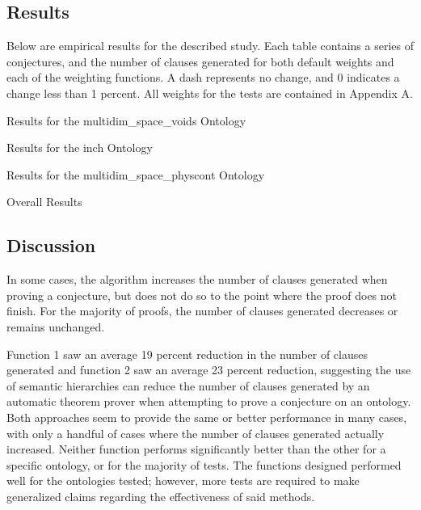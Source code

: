 \documentclass{article}
\begin{document}
\subsection{Results}
Below are empirical results for the described study. Each table contains a series of conjectures, and the number of clauses generated for both default weights and each of the weighting functions. A dash represents no change, and 0 indicates a change less than 1 percent.  All weights for the tests are contained in Appendix A. 
\vspace{1cm}
\begin{table}[h]
\centering
{}
\caption{Results for the multidim\_space\_voids Ontology}
\end{table}

\begin{table}[h]
\centering
{}
\caption{Results for the inch Ontology}
\end{table}

\begin{table}[h]
\centering
{}
\caption{Results for the multidim\_space\_physcont Ontology}
\end{table}

\begin{table}[h]
\centering
{}
\caption{Overall Results}
\end{table}

\newpage
\subsection{Discussion}
In some cases, the algorithm increases the number of clauses generated when proving a conjecture, but does not do so to the point where the proof does not finish. For the majority of proofs, the number of clauses generated decreases or remains unchanged.

Function 1 saw an average 19 percent reduction in the number of clauses generated and function 2 saw an average 23 percent reduction, suggesting the use of semantic hierarchies can reduce the number of clauses generated by an automatic theorem prover when attempting to prove a conjecture on an ontology. Both approaches seem to provide the same or better performance in many cases, with only a handful of cases where the number of clauses generated actually increased. Neither function performs significantly better than the other for a specific ontology, or for the majority of tests. The functions designed performed well for the ontologies tested; however, more tests are required to make generalized claims regarding the effectiveness of said methods. 
\end{document}
